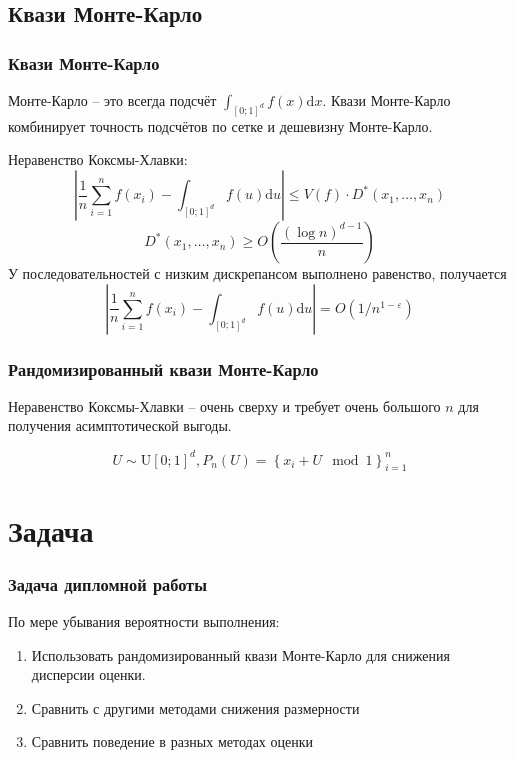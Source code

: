 \documentclass[unicode, notheorems]{beamer}
\newcommand{\abs}[1]{\left\lvert#1\right\rvert}
\begin{document}
	\subsection{Квази Монте-Карло} %
	\label{sub:quasi_mc}
	\begin{frame}
	\frametitle{Квази Монте-Карло} 
	Монте-Карло -- это всегда подсчёт $\int_{\left[0;1\right]^d} f(x)\mathrm{d} x$. Квази Монте-Карло комбинирует точность подсчётов по сетке и дешевизну Монте-Карло.

	Неравенство Коксмы-Хлавки:
	$$\abs{\frac{1}{n}\sum_{i=1}^n f(x_i) - \int_{\left[0;1\right]^d} f(u)\mathrm{d} u} \leq V(f)\cdot D^*(x_1, \ldots, x_n)$$
	$$D^*(x_1, \ldots, x_n) \geq O\left(\frac{\left(\log n\right)^{d-1}}{n}\right)$$
	У последовательностей с низким дискрепансом выполнено равенство, получается
	$$\abs{\frac{1}{n}\sum_{i=1}^n f(x_i) - \int_{\left[0;1\right]^d} f(u)\mathrm{d} u} = O(1 / n^{1-\varepsilon})$$
	\end{frame}

	\begin{frame}
	\frametitle{Рандомизированный квази Монте-Карло} 
	Неравенство Коксмы-Хлавки -- очень сверху и требует очень большого $n$ для получения асимптотической выгоды.

	$$U \sim \mathrm{U}\left[0;1\right]^d, P_n(U) = \left\lbrace x_i + U \mod 1\right\rbrace_{i=1}^n$$
	\end{frame}


\section{Задача} %
\label{sec:specific_task_statement}
\begin{frame}
\frametitle{Задача дипломной работы} 
По мере убывания вероятности выполнения:
\begin{enumerate}
	\item Использовать рандомизированный квази Монте-Карло для снижения дисперсии оценки. 
	\item Сравнить с другими методами снижения размерности
	\item Сравнить поведение в разных методах оценки
\end{enumerate}
\end{frame}

\end{document}
